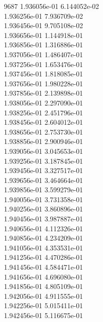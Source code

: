 9687	1.936056e-01	6.144052e-02	\\ 	1.936256e-01	7.936709e-02	\\ 	1.936456e-01	9.705108e-02	\\ 	1.936656e-01	1.144918e-01	\\ 	1.936856e-01	1.316886e-01	\\ 	1.937056e-01	1.486407e-01	\\ 	1.937256e-01	1.653476e-01	\\ 	1.937456e-01	1.818085e-01	\\ 	1.937656e-01	1.980228e-01	\\ 	1.937856e-01	2.139898e-01	\\ 	1.938056e-01	2.297090e-01	\\ 	1.938256e-01	2.451796e-01	\\ 	1.938456e-01	2.604012e-01	\\ 	1.938656e-01	2.753730e-01	\\ 	1.938856e-01	2.900946e-01	\\ 	1.939056e-01	3.045653e-01	\\ 	1.939256e-01	3.187845e-01	\\ 	1.939456e-01	3.327517e-01	\\ 	1.939656e-01	3.464664e-01	\\ 	1.939856e-01	3.599279e-01	\\ 	1.940056e-01	3.731358e-01	\\ 	1.940256e-01	3.860896e-01	\\ 	1.940456e-01	3.987887e-01	\\ 	1.940656e-01	4.112326e-01	\\ 	1.940856e-01	4.234209e-01	\\ 	1.941056e-01	4.353531e-01	\\ 	1.941256e-01	4.470286e-01	\\ 	1.941456e-01	4.584471e-01	\\ 	1.941656e-01	4.696080e-01	\\ 	1.941856e-01	4.805109e-01	\\ 	1.942056e-01	4.911555e-01	\\ 	1.942256e-01	5.015411e-01	\\ 	1.942456e-01	5.116675e-01	\\ \hline

